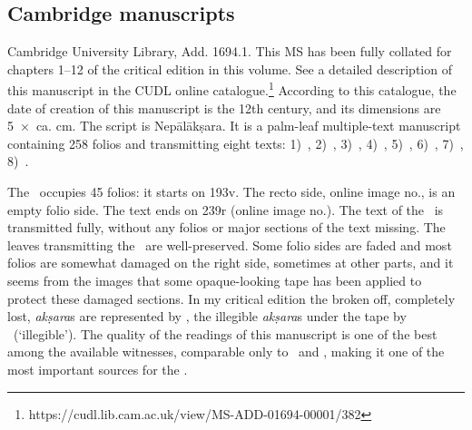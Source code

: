 \medskip
\label{mss_descr}
\subsection{Cambridge manuscripts}

Cambridge University Library, Add. 1694.1. This MS has been 
fully collated for chapters 1--12 of the critical edition in this volume. 
See a detailed description of this manuscript in the 
CUDL online catalogue.\footnote{https://cudl.lib.cam.ac.uk/view/MS-ADD-01694-00001/382}
According to this catalogue, the date of creation of this manuscript 
is the 12th century, and its dimensions are 5~×~ca. cm. 
The script is Nepālākṣara. It is a palm-leaf multiple-text manuscript containing 258
folios and transmitting eight texts: 
1)~\SDhS,
2)~\SDhU,
3)~\SDhSangr,
4)~\Ums,
5)~\Uums, 
6)~\Vss,
7)~\DharmP,
8)~\SivaUp.

The \VSS\ occupies 45 folios: it starts on \fol193v. 
The recto side, online image no., is an empty folio side. 
The text ends on \fol239r (online image no.). 
The text of the \VSS\ is transmitted fully,
without any folios or major sections of the text missing. The leaves
transmitting the \VSS\ are well-preserved. Some folio sides are faded and
most folios are somewhat damaged on the right side, 
sometimes at other parts, and it seems from the images 
that some opaque-looking tape has been applied to protect these damaged sections. 
In my critical edition the broken off, completely lost, 
\emph{akṣara}s are represented by \lac,
the illegible \emph{akṣara}s under the tape by \lk\ (`illegible'). The
quality of the readings of this manuscript is one of the best among
the available witnesses, comparable only to \msNa\ and \msParis, 
making it one of the most important sources for the \VSS.


